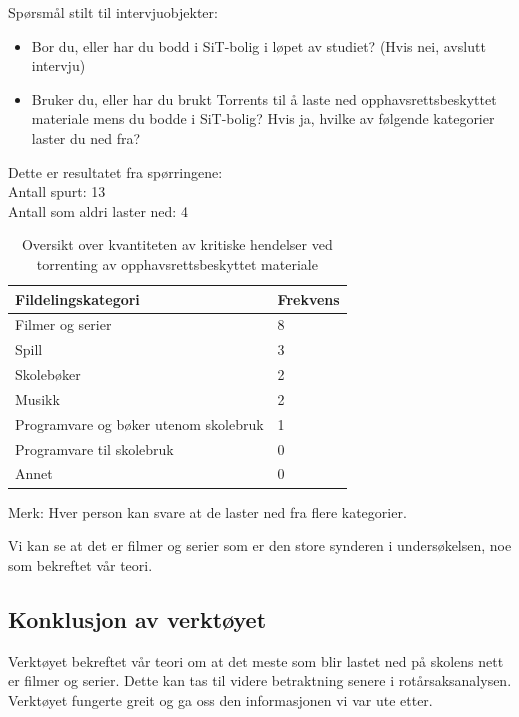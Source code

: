 Spørsmål stilt til intervjuobjekter:
\begin{itemize}
    \item Bor du, eller har du bodd i SiT-bolig i løpet av studiet? (Hvis nei, avslutt intervju)
    \item Bruker du, eller har du brukt Torrents til å laste ned opphavsrettsbeskyttet materiale mens du bodde i SiT-bolig? Hvis ja, hvilke av følgende kategorier laster du ned fra?
\end{itemize}

\noindent Dette er resultatet fra spørringene: \\
\indent Antall spurt: 13 \\
\indent Antall som aldri laster ned: 4
\begin{table} [H]
    \begin{tabular}{ | m{20em} | m{20em} | }
        \hline
            \cellcolor{yellow} Fildelingskategori & \cellcolor{yellow} Frekvens \\
        \hline
            Filmer og serier & 8  \\
        \hline
            Spill & 3 \\
        \hline
            Skolebøker & 2 \\
        \hline
            Musikk & 2 \\
        \hline
            Programvare og bøker utenom skolebruk & 1 \\
        \hline
            Programvare til skolebruk & 0 \\
        \hline
            Annet & 0 \\
        \hline
    \end{tabular}
    \caption{Oversikt over kvantiteten av kritiske hendelser ved torrenting av opphavsrettsbeskyttet materiale}
    \label{kritisk_tabell_1}
\end{table}

Merk: Hver person kan svare at de laster ned fra flere kategorier.

\noindent Vi kan se at det er filmer og serier som er den store synderen i undersøkelsen, noe som bekreftet vår teori. 

\subsection{Konklusjon av verktøyet}
Verktøyet bekreftet vår teori om at det meste som blir lastet ned på skolens nett er filmer og serier. Dette kan tas til videre betraktning senere i rotårsaksanalysen. Verktøyet fungerte greit og ga oss den informasjonen vi var ute etter. 